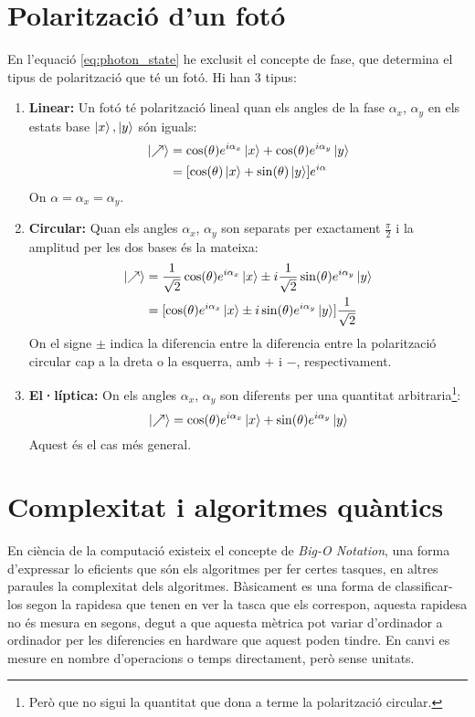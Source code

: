 \chapter{Polarització d'un fotó}
\label{appendix:optics}
En l'equació \ref{eq:photon_state} he exclusit el concepte de fase, que determina el tipus de polarització que té un fotó. Hi han 3 tipus:
\begin{enumerate}
	\item \textbf{Linear:}
	Un fotó té polarització lineal quan els angles de la fase $\alpha_x$, $\alpha_y$ en els estats base $\ket{x},\ket{y}$ són iguals:
	\begin{align*}
		\ket{\nearrow} &= \cos(\theta) e^{i\alpha_x}\ket{x} + \cos(\theta)e^{i\alpha_y}\ket{y} \\
		&= [\cos(\theta)\ket{x} + \sin(\theta)\ket{y}]e^{i\alpha}
	\end{align*}
	On $\alpha=\alpha_x=\alpha_y$.
	\item \textbf{Circular:}
	Quan els angles $\alpha_x$, $\alpha_y$ son separats per exactament $\frac{\pi}{2}$ i la amplitud per les dos bases és la mateixa:
	\begin{align*}
		\ket{\nearrow} &= \frac{1}{\sqrt{2}}\cos(\theta)e^{i\alpha_x}\ket{x} \pm i\frac{1}{\sqrt{2}}\sin(\theta)e^{i\alpha_y}\ket{y} \\
					   &= [\cos(\theta)e^{i\alpha_x}\ket{x} \pm i\sin(\theta)e^{i\alpha_y}\ket{y}]\frac{1}{\sqrt{2}}
	\end{align*}
	On el signe $\pm$ indica la diferencia entre la diferencia entre la polarització circular cap a la dreta o la esquerra, amb $+$ i $-$, respectivament.
	\item \textbf{El·líptica:}
	On els angles $\alpha_x$, $\alpha_y$ son diferents per una quantitat arbitraria\footnote{Però que no sigui la quantitat que dona a terme la polarització circular.}:
	$$
	\ket{\nearrow} = \cos(\theta)e^{i\alpha_x}\ket{x} + \sin(\theta)e^{i\alpha_y}\ket{y}
	$$
	Aquest és el cas més general.
	
\end{enumerate}

\chapter{Complexitat i algoritmes quàntics}
\label{complexity}
En ciència de la computació existeix el concepte de \textit{Big-O Notation}, una forma d'expressar lo eficients que són els algoritmes per fer certes tasques, en altres paraules la complexitat dels algoritmes. Bàsicament es una forma de classificar-los segon la rapidesa que tenen en ver la tasca que els correspon, aquesta rapidesa no és mesura en segons, degut a que aquesta mètrica pot variar d'ordinador a ordinador per les diferencies en hardware que aquest poden tindre. En canvi es mesure en nombre d'operacions o temps directament, però sense unitats. 

